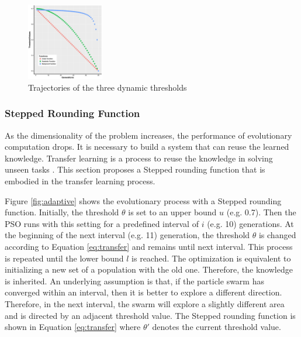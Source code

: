 \documentclass[10pt,journal,compsoc]{IEEEtran}
\begin{document}




\begin{figure}[H]
\centering
  \includegraphics[width=0.3\textwidth]{pics/roundingFunctions.png}
  \caption{Trajectories of the three dynamic thresholds}
  \label{fig:dynamic}
\end{figure}
%
\vspace{-3 mm}
\subsubsection{Stepped Rounding Function}
\label{sec:transfer}
As the dimensionality of the problem increases, the performance of evolutionary computation drops.
It is necessary to build a system that can reuse the learned knowledge.
Transfer learning is a process to reuse the knowledge in solving unseen tasks \cite{olivas}.
This section proposes a Stepped rounding function that is embodied in the transfer learning process.

Figure \ref{fig:adaptive} shows the evolutionary process with a Stepped rounding function. %
Initially, the threshold $\theta$ is set to an upper bound $u$ (e.g. 0.7). Then the PSO runs with this setting for a predefined interval of $i$ (e.g. 10) generations. At the beginning of the next interval (e.g. 11) generation, the threshold $\theta$ is changed according to Equation \ref{eq:transfer} and remains until next interval. This process is repeated until the lower bound $l$ is reached. The optimization is equivalent to initializing a new set of a population with the old one. Therefore, the knowledge is inherited. An underlying assumption is that, if the particle swarm has converged within an interval, then it is better to explore a different direction. Therefore, in the next interval, the swarm will explore a slightly different area and is directed by an adjacent threshold value. 
The Stepped rounding function is shown in Equation \ref{eq:transfer} where $\theta'$ denotes the current threshold value.
\end{document}
